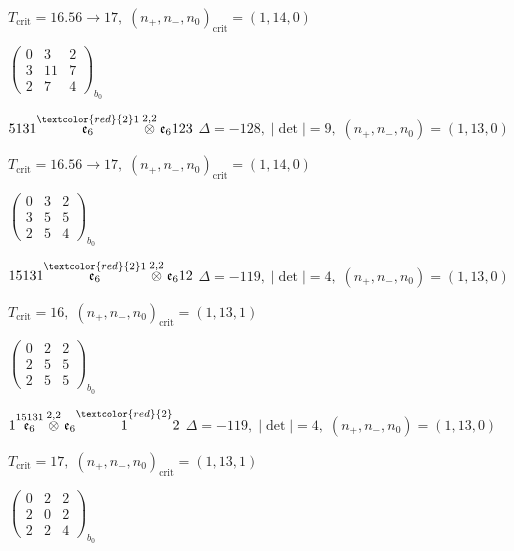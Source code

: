 \documentclass[10pt]{article}
\begin{document}
\hspace{1em}$T_{\text{crit}}=16.56 \to 17,\; (n_+,n_-,n_0)_{\text{crit}}=(1,14,0)$

\hspace{2em}$\left(\begin{smallmatrix}0 & 3 & 2 \\ 3 & 11 & 7 \\ 2 & 7 & 4\end{smallmatrix}\right)_{\!b_0}$

\smallskip

$5131\overset{\textcolor{red}{2}1}{\mathfrak{e}_6}\overset{2,2}{\otimes}\mathfrak{e}_6123$ \quad $\Delta=-128,\; |\det|=9,\; (n_+,n_-,n_0)=(1,13,0)$

\hspace{1em}$T_{\text{crit}}=16.56 \to 17,\; (n_+,n_-,n_0)_{\text{crit}}=(1,14,0)$

\hspace{2em}$\left(\begin{smallmatrix}0 & 3 & 2 \\ 3 & 5 & 5 \\ 2 & 5 & 4\end{smallmatrix}\right)_{\!b_0}$

\smallskip

$15131\overset{\textcolor{red}{2}1}{\mathfrak{e}_6}\overset{2,2}{\otimes}\mathfrak{e}_612$ \quad $\Delta=-119,\; |\det|=4,\; (n_+,n_-,n_0)=(1,13,0)$

\hspace{1em}$T_{\text{crit}}=16,\; (n_+,n_-,n_0)_{\text{crit}}=(1,13,1)$

\hspace{2em}$\left(\begin{smallmatrix}0 & 2 & 2 \\ 2 & 5 & 5 \\ 2 & 5 & 5\end{smallmatrix}\right)_{\!b_0}$

$1\overset{15131}{\mathfrak{e}_6}\overset{2,2}{\otimes}\mathfrak{e}_6\overset{\textcolor{red}{2}}{1}2$ \quad $\Delta=-119,\; |\det|=4,\; (n_+,n_-,n_0)=(1,13,0)$

\hspace{1em}$T_{\text{crit}}=17,\; (n_+,n_-,n_0)_{\text{crit}}=(1,13,1)$

\hspace{2em}$\left(\begin{smallmatrix}0 & 2 & 2 \\ 2 & 0 & 2 \\ 2 & 2 & 4\end{smallmatrix}\right)_{\!b_0}$
\end{document}
